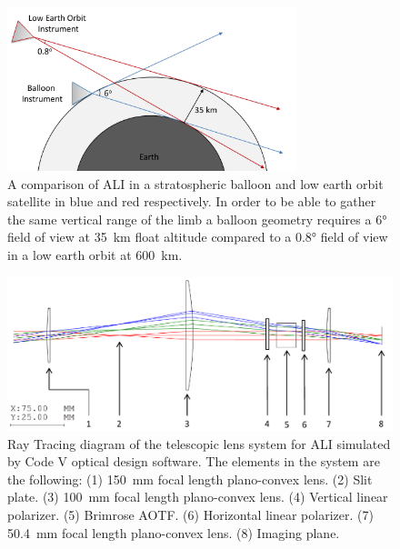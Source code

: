 \documentclass[12pt]{article}
\begin{document}
\clearpage

\begin{figure}
        \centering
        \includegraphics[width=0.75\textwidth]{./Images/5-4-BalloonGeometry.pdf}
        \caption{A comparison of ALI in a stratospheric balloon and low earth orbit satellite in blue and red respectively. In order to be able to gather the same vertical range 
of the limb a balloon geometry requires a 6\si{\degree} field of view at 35~km float altitude compared to a 0.8\si{\degree} field of view in a low earth orbit at 
600~km.}
        \label{fig:5.4:balloonGeometry}
\end{figure}

\clearpage

\begin{figure}
    \includegraphics[width=1.0\textwidth]{./Images/3-2-TelescopicRayTracing.pdf}
    \caption{Ray Tracing diagram of the telescopic lens system for ALI simulated by Code V optical design software. The elements in the system are the following: (1) 150~mm 
focal length plano-convex lens. (2) Slit plate. (3) 100~mm focal length plano-convex lens. (4) Vertical linear polarizer. (5) Brimrose AOTF. (6) Horizontal linear polarizer. 
(7) 50.4~mm focal length plano-convex lens. (8) Imaging plane.}
    \label{fig:3.2:telescopicRayTracing}
\end{figure}

\clearpage
\end{document}
